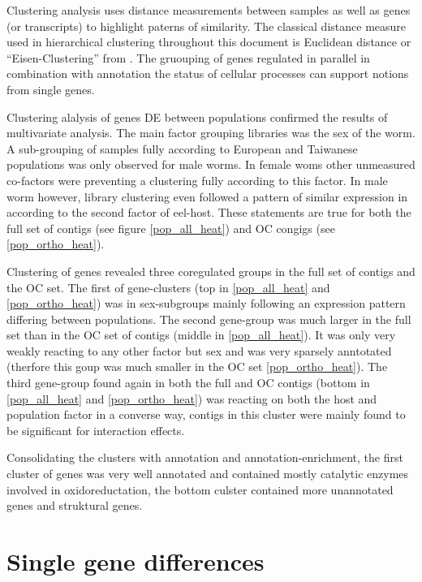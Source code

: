 Clustering analysis uses distance measurements between samples as well
as genes (or transcripts) to highlight paterns of similarity. The
classical distance measure used in hierarchical clustering throughout
this document is Euclidean distance or ``Eisen-Clustering'' from
\cite{pmid9843981}. The gruouping of genes regulated in parallel in
combination with annotation the status of cellular processes can
support notions from single genes.

Clustering alalysis of genes DE between populations confirmed the
results of multivariate analysis. The main factor grouping libraries
was the sex of the worm. A sub-grouping of samples fully according to
European and Taiwanese populations was only observed for male
worms. In female woms other unmeasured co-factors were preventing a
clustering fully according to this factor. In male worm however,
library clustering even followed a pattern of similar expression in
according to the second factor of eel-host. These statements are true
for both the full set of contigs (see figure \ref{pop_all_heat}) and
OC congigs (see \ref{pop_ortho_heat}).

Clustering of genes revealed three coregulated groups in the full set
of contigs and the OC set. The first of gene-clusters (top in
\ref{pop_all_heat} and \ref{pop_ortho_heat}) was in sex-subgroups
mainly following an expression pattern differing between
populations. The second gene-group was much larger in the full set
than in the OC set of contigs (middle in \ref{pop_all_heat}). It was
only very weakly reacting to any other factor but sex and was very
sparsely anntotated (therfore this goup was much smaller in the OC set
\ref{pop_ortho_heat}). The third gene-group found again in both the
full and OC contigs (bottom in \ref{pop_all_heat} and
\ref{pop_ortho_heat}) was reacting on both the host and population
factor in a converse way, contigs in this cluster were mainly found to
be significant for interaction effects.


Consolidating the clusters with annotation and annotation-enrichment,
the first cluster of genes was very well annotated and contained
mostly catalytic enzymes involved in oxidoreductation, the bottom
culster contained more unannotated genes and struktural genes.

\section{Single gene differences}
\label{sec:single-gene-diff}


